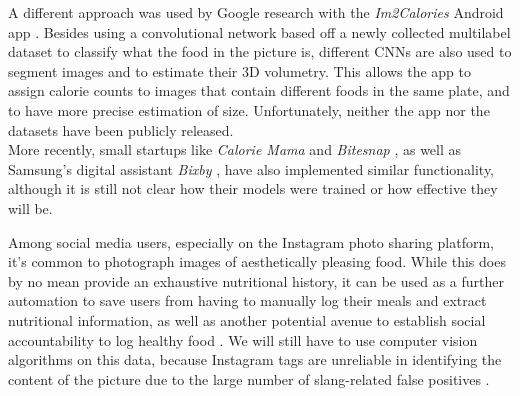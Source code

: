 A different approach was used by Google research with the \textit{Im2Calories} Android app \cite{Myers2015}. Besides using a convolutional network based off a newly collected multilabel dataset to classify what the food in the picture is, different CNNs are also used to segment images and to estimate their 3D volumetry. This allows the app to assign calorie counts to images that contain different foods in the same plate, and to have more precise estimation of size. Unfortunately, neither the app nor the datasets have been publicly released.\\
More recently, small startups like \textit{Calorie Mama} \cite{caloriemamaai} and \textit{Bitesnap} \cite{bitesnap}, as well as Samsung's digital assistant \textit{Bixby} \cite{bixbyarticle}, have also implemented similar functionality, although it is still not clear how their models were trained or how effective they will be. 

Among social media users, especially on the Instagram photo sharing platform, it's common to photograph images of aesthetically pleasing food. While this does by no mean provide an exhaustive nutritional history, it can be used as a further automation to save users from having to manually log their meals and extract nutritional information, as well as another potential avenue to establish social accountability to log healthy food \cite{Sharma:2015:MCN:2740908.2742754}. We will still have to use computer vision algorithms on this data, because Instagram tags are unreliable in identifying the content of the picture due to the large number of slang-related false positives \cite{hospedales2016}.
